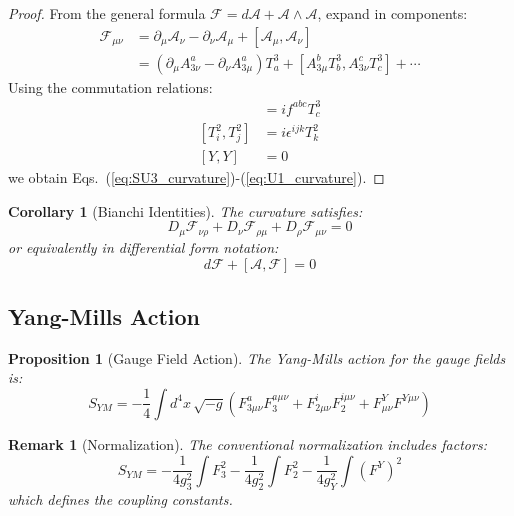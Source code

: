 \documentclass[12pt]{article}
\newtheorem{corollary}[definition]{Corollary}
\newtheorem{proposition}[definition]{Proposition}
\newtheorem{remark}[definition]{Remark}
\begin{document}
\begin{proof}
From the general formula $\mathcal{F} = d\mathcal{A} + \mathcal{A} \wedge \mathcal{A}$, expand in components:
\begin{align}
\mathcal{F}_{\mu\nu} &= \partial_\mu \mathcal{A}_\nu - \partial_\nu \mathcal{A}_\mu + [\mathcal{A}_\mu, \mathcal{A}_\nu] \\
&= (\partial_\mu A^a_{3\nu} - \partial_\nu A^a_{3\mu}) T_a^3 + [A^b_{3\mu} T_b^3, A^c_{3\nu} T_c^3] + \cdots
\end{align}
Using the commutation relations:
\begin{align}
[T_a^3, T_b^3] &= i f^{abc} T_c^3 \\
[T_i^2, T_j^2] &= i \epsilon^{ijk} T_k^2 \\
[Y, Y] &= 0
\end{align}
we obtain Eqs.~(\ref{eq:SU3_curvature})-(\ref{eq:U1_curvature}).
\end{proof}

\begin{corollary}[Bianchi Identities]
The curvature satisfies:
\begin{equation}
D_\mu \mathcal{F}_{\nu\rho} + D_\nu \mathcal{F}_{\rho\mu} + D_\rho \mathcal{F}_{\mu\nu} = 0
\end{equation}
or equivalently in differential form notation:
\begin{equation}
d\mathcal{F} + [\mathcal{A}, \mathcal{F}] = 0
\end{equation}
\end{corollary}

\subsection{Yang-Mills Action}

\begin{proposition}[Gauge Field Action]
The Yang-Mills action for the gauge fields is:
\begin{equation}
S_{YM} = -\frac{1}{4} \int d^4x \, \sqrt{-g} \left( F^a_{3\mu\nu} F_3^{a\mu\nu} + F^i_{2\mu\nu} F_2^{i\mu\nu} + F^Y_{\mu\nu} F^{Y\mu\nu} \right)
\end{equation}
\end{proposition}

\begin{remark}[Normalization]
The conventional normalization includes factors:
\begin{equation}
S_{YM} = -\frac{1}{4g_3^2} \int F_3^2 - \frac{1}{4g_2^2} \int F_2^2 - \frac{1}{4g_Y^2} \int (F^Y)^2
\end{equation}
which defines the coupling constants.
\end{remark}
\end{document}
